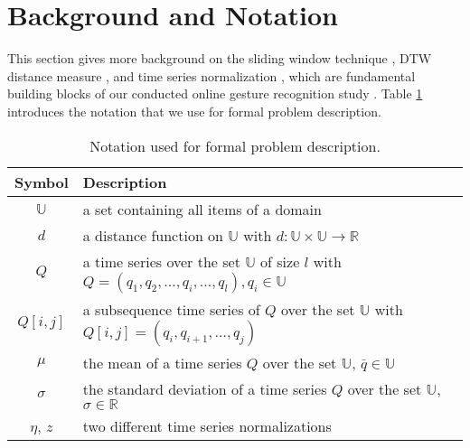 \section{Background and Notation} \label{background_and_notation}

This section gives more background on the sliding window technique \cite{keogh2004sliding}, DTW distance measure \cite{keogh2002exact}, and time series normalization \cite{das1998rule}, which are fundamental building blocks of our conducted online gesture recognition study \cite{lesti2017filter}. Table \ref{tab:notation} introduces the notation that we use for formal problem description.

\begin{table}
    \begin{center}
        \begin{tabularx}{\textwidth}{c X}
            \hline
            \textbf{Symbol} \qquad & \textbf{Description}\\
            \hline
            $\mathbb{U}$ & a set containing all items of a domain\\
            $d$ & a distance function on $\mathbb{U}$ with $d: \mathbb{U} \times \mathbb{U} \to \mathbb{R}$\\
            $Q$ & a time series over the set $\mathbb{U}$ of size $l$ with
                $Q = (q_1, q_2, \dots, q_i, \dots, q_l), q_i \in \mathbb{U}$\\
            $Q[i,j]$ & a subsequence time series of $Q$ over the set $\mathbb{U}$ with $Q[i,j] = (q_i, q_{i+1}, \dots, q_{j})$\\
            $\mu$ & the mean of a time series $Q$ over the set $\mathbb{U}$, $\bar{q} \in \mathbb{U}$\\
            $\sigma$ & the standard deviation of a time series $Q$ over the set $\mathbb{U}$, $\sigma \in \mathbb{R}$\\
            $\eta$, $z$  & two different time series normalizations\\
            \hline
        \end{tabularx}
    \end{center}
    \caption{Notation used for formal problem description.}
	\label{tab:notation}
\end{table}



